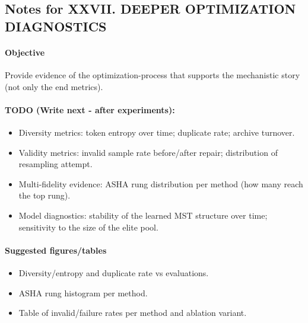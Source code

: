 \subsection*{Notes for XXVII. DEEPER OPTIMIZATION DIAGNOSTICS}
\paragraph{Objective}
Provide evidence of the optimization-process that supports the mechanistic story (not only the end metrics).

\paragraph{TODO (Write next - after experiments):}
\begin{itemize}
  \item Diversity metrics: token entropy over time; duplicate rate; archive turnover.
  \item Validity metrics: invalid sample rate before/after repair; distribution of resampling attempt.
  \item Multi-fidelity evidence: ASHA rung distribution per method (how many reach the top rung).
  \item Model diagnostics: stability of the learned MST structure over time; sensitivity to the size of the elite pool.
\end{itemize}

\paragraph{Suggested figures/tables}
\begin{itemize}
  \item Diversity/entropy and duplicate rate vs evaluations.
  \item ASHA rung histogram per method.
  \item Table of invalid/failure rates per method and ablation variant.
\end{itemize}

